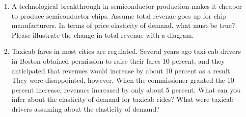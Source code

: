 \documentclass{article}
\begin{document}
\begin{enumerate}
\item A technological breakthrough in semiconductor production makes it cheaper to produce semiconductor chips. Assume total revenue goes up for chip manufacturers. In terms of price elasticity of demand, what must be true? Please illustrate the change in total revenue with a diagram.

\item Taxicab fares in most cities are regulated. Several years ago taxi-cab drivers in Boston obtained permission to raise their fares 10 percent, and they anticipated that revenues would increase by about 10 percent as a result. They were disappointed, however. When the commissioner granted the 10 percent increase, revenues increased by only about 5 percent. What can you infer about the elasticity of demand for taxicab rides? What were taxicab drivers assuming about the elasticity of demand?

\end{enumerate}
\end{document}
